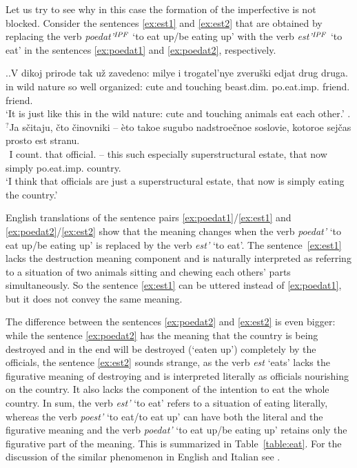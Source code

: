Let us try to see why in this case the formation of the imperfective is not blocked. Consider the sentences \ref{ex:est1} and \ref{ex:est2} that are obtained by replacing the verb \textit{poedat'$^{\mathit{IPF}}$} `to eat up/be eating up' with the verb \textit{est'$^{\mathit{IPF}}$} `to eat' in the sentences \ref{ex:poedat1} and \ref{ex:poedat2}, respectively.
 
 \ex.\ag.\label{ex:est1}V dikoj prirode tak u\v{z} zavedeno: milye i trogatel'nye zveru\v{s}ki edjat drug druga.\\
in wild nature so well organized: cute and touching beast.dim. po.eat.imp. friend. friend.\\
\vspace{0.5em}
`It is just like this in the wild nature: cute and touching animals eat each other.'
\bg.$^?$Ja s\v{c}itaju, \v{c}to \v{c}inovniki -- \`{e}to takoe sugubo nadstroe\v{c}noe soslovie, kotoroe sej\v{c}as prosto est stranu.\label{ex:est2}\\
\textcolor{white}{$^?$}I count. that official. -- this such especially superstructural estate, that now simply po.eat.imp. country.\\
\vspace{0.5em}
`I think that officials are just a superstructural estate, that now is simply eating the country.'

English translations of the sentence pairs \ref{ex:poedat1}/\ref{ex:est1} and \ref{ex:poedat2}/\ref{ex:est2} show that  the meaning changes when the verb \textit{poedat'} `to eat up/be eating up' is replaced by the verb \textit{est'} `to eat'. The sentence~\ref{ex:est1} lacks the destruction meaning component and is naturally interpreted as referring to a situation of two animals sitting and chewing each others' parts simultaneously. So the sentence \ref{ex:est1} can be uttered instead of \ref{ex:poedat1}, but it does not convey the same meaning.

The difference between the sentences \ref{ex:poedat2} and \ref{ex:est2} is even bigger: while the sentence \ref{ex:poedat2} has the meaning that the country is being destroyed and in the end will be destroyed (`eaten up') completely by the officials, the sentence \ref{ex:est2} sounds strange, as the verb \textit{est} `eats' lacks the figurative meaning of destroying and is interpreted literally as officials nourishing on the country. It also lacks the component of the intention to eat the whole country. In sum, the verb \textit{est'} `to eat' refers to a situation of eating literally, whereas the verb \textit{poest'} `to eat/to eat up' can have both the literal and the figurative meaning and the verb \textit{poedat'} `to eat up/be eating up' retains only the figurative part of the meaning. This is summarized in Table~\ref{table:eat}. For the discussion of the similar phenomenon in English and Italian see \citet{FolliHarley:05}.

